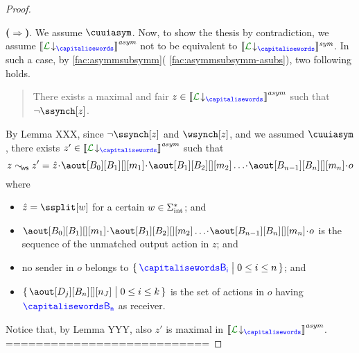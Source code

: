 \begin{proof}
\begin{description}
\end{description}


%
 {\bf ($\Rightarrow$)}.
 We assume $\cuuiasym$. Now, to show the thesis by contradiction, we assume 
 $\asem{\proj{\clang}{}}$ not to be equivalent to $\ssem{\proj{\clang}{}}$.
 In such a case, by \cref{fac:asymmsubsymm}( \ref{fac:asymmsubsymm-asubs}),
two following holds.
\begin{quote}
There exists a maximal and fair $z\in \asem{\proj{\clang}{}}$ such that  $\neg\ssynch[z]$.
\end{quote}

 By Lemma XXX, since $\neg\ssynch[z]$ and $\wsynch[z]$, and we assumed $\cuuiasym$, there exists 
 $z'\in\asem{\proj{\clang}{}}$ such that 
 $$z\commds z' = \hat z \cat\aout[B_0][B_1][][m_1]\cat\aout[B_1][B_2][][m_2]\ldots\cat\aout[B_{n-1}][B_n][][m_n]\cat o$$
  where
  \begin{itemize}
  \item
 $\hat z = \ssplit[\acword]$ for a certain $w\in\Sigma_{\text{int}}^*$; and 
 \item 
 $\aout[B_0][B_1][][m_1]\cat\aout[B_1][B_2][][m_2]\ldots\cat\aout[B_{n-1}][B_n][][m_n]\cat o$ is the sequence
 of the unmatched 
 output action in $z$; and
 \item
 no sender in $o$ belongs to $\Set{\ptp[B_i] \sst 0\leq i \leq n}$; and
 \item
 $\Set{\aout[D_j][B_n][][n_J] \sst 0\leq i \leq k}$ is the set of actions in $o$ having $\ptp[B_n]$ 
 as receiver. 
 \end{itemize}  
 Notice that, by Lemma YYY, also $z'$ is maximal in $\asem{\proj{\clang}{}}$.\\





===========================


\end{proof}
